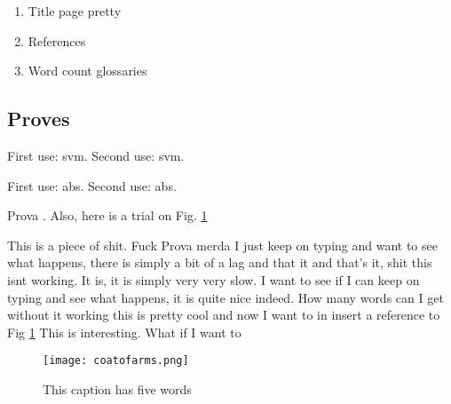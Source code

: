 
\begin{enumerate}

\item Title page pretty

\item References

\item Word count glossaries

\end{enumerate}


\subsection{Proves}

First use: \gls{svm}. Second use: \gls{svm}.

First use: \gls{abs}. Second use: \gls{abs}.

Prova \cite{mike}. Also, here is a trial on Fig. \ref{caca}


This is a piece of shit. Fuck Prova merda I just keep on typing and want to see what happens, there is simply a bit of a lag and that it and that's it, shit this isnt working. It is, it is simply very very slow. I want to see if I can keep on typing and see what happens, it is quite nice indeed. How many words can I get without it working this is pretty cool and now I want to in insert a reference to Fig \ref{caca} This is interesting. What if I want to \cite{mike}

\begin{figure}[htbp]
\begin{center}
\texttt{[image: coatofarms.png]}
\caption{This caption has five words}
\label{caca}
\end{center}
\end{figure}
